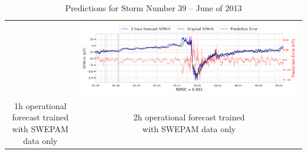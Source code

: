\documentclass[draft,sw]{agutexSI2019}
\begin{document}
\begin{table}
\begin{tabular}{cc}
&
\includegraphics[width=0.49\linewidth]{paper_plots_shade/2h_swepam_rt/2h_swepam_rt_storm_39.png}
\\
\shortstack{1h operational forecast trained\\ with SWEPAM data only} & \shortstack{2h operational forecast trained\\ with SWEPAM data only}
\vspace*{12pt}
\\
\end{tabular}
\caption{Predictions for Storm Number 39 -- June of 2013}
\label{storm-39}
\end{table}
\end{document}

